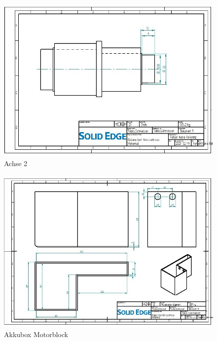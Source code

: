 \begin{figure} [H]
	\begin{center}
		\includegraphics[angle=90]{figures/mechanik/Achse_mit_nuten_20mm_Zeichnung.jpg}
		\caption{Achse 2}
		\label{fig:Achse2}
	\end{center}
\end{figure}

\begin{figure} [H]
	\begin{center}
		\includegraphics[angle=90]{figures/mechanik/Box_Zeichnung.jpg}
		\caption{Akkubox Motorblock}
		\label{fig:Akkubox Motorblock}
	\end{center}
\end{figure}

